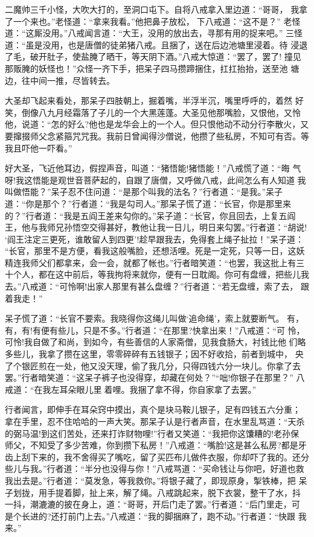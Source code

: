 二魔帅三千小怪，大吹大打的，至洞口屯下。自将八戒拿入里边道：“哥哥，
我拿了一个来也。”老怪道：“拿来我看。”他把鼻子放松，下八戒道：“这不是？”
老怪道：“这厮没用。”八戒闻言道：“大王，没用的放出去，寻那有用的捉来吧。”
三怪道：“虽是没用，也是唐僧的徒弟猪八戒。且捆了，送在后边池塘里浸着。待
浸退了毛，破开肚子，使盐腌了晒干，等天阴下酒。”八戒大惊道：“罢了，罢了!
撞见那贩腌的妖怪也！”众怪一齐下手，把呆子四马攒蹄捆住，扛扛抬抬，送至池
塘边，往中间一推，尽皆转去。

大圣却飞起来看处，那呆子四肢朝上，掘着嘴，半浮半沉，嘴里呼呼的，着然
好笑，倒像八九月经霜落了子儿的一个大黑莲蓬。大圣见他那嘴脸，又恨他，又怜
他，说道：“怎的好么?他也是龙华会上的一个人。但只恨他动不动分行李散火，又
要撺掇师父念紧箍咒咒我。我前日曾闻得沙僧说，他攒了些私房，不知可有否。等
我且吓他一吓看。”

好大圣，飞近他耳边，假捏声音，叫道：“猪悟能!猪悟能！”八戒慌了道：“晦
气呀!我这悟能是观世音菩萨起的，自跟了唐僧，又呼做八戒，此间怎么有人知道
我叫做悟能？”呆子忍不住问道：“是那个叫我的法名？”行者道：“是我。”呆子
道：“你是那个？”行者道：“我是勾司人。”那呆子慌了道：“长官，你是那里来
的？”行者道：“我是五阎王差来勾你的。”呆子道：“长官，你且回去，上复五阎
王，他与我师兄孙悟空交得甚好，教他让我一日儿，明日来勾罢。”行者道：“胡说!
‘阎王注定三更死，谁敢留人到四更’!趁早跟我去，免得套上绳子扯拉！”呆子道：
“长官，那里不是方便，看我这般嘴脸，还想活哩。死是一定死，只等一日，这妖
精连我师父们都拿来，会一会，就都了帐也。”行者暗笑道：“也罢，我这批上有三
十个人，都在这中前后，等我拘将来就你，便有一日耽阁。你可有盘缠，把些儿我
去。”八戒道：“可怜啊!出家人那里有甚么盘缠？”行者道：“若无盘缠，索了去，
跟着我走！”

呆子慌了道：“长官不要索。我晓得你这绳儿叫做‘追命绳’，索上就要断气。
有，有，有!有便有些儿，只是不多。”行者道：“在那里?快拿出来！”八戒道：“可
怜，可怜!我自做了和尚，到如今，有些善信的人家斋僧，见我食肠大，衬钱比他
们略多些儿，我拿了攒在这里，零零碎碎有五钱银子；因不好收拾，前者到城中，
央了个银匠煎在一处，他又没天理，偷了我几分，只得四钱六分一块儿。你拿了去
罢。”行者暗笑道：“这呆子裤子也没得穿，却藏在何处？”“咄!你银子在那里？”
八戒道：“在我左耳朵眼儿里着哩。我捆了拿不得，你自家拿了去罢。”

行者闻言，即伸手在耳朵窍中摸出，真个是块马鞍儿银子，足有四钱五六分重；
拿在手里，忍不住哈哈的一声大笑。那呆子认是行者声音，在水里乱骂道：“天杀
的弼马温!到这们苦处，还来打诈财物哩!”行者又笑道：“我把你这馕糟的!老孙保
师父，不知受了多少苦难，你到攒下私房！”八戒道：“嘴脸!这是甚么私房?都是牙
齿上刮下来的，我不舍得买了嘴吃，留了买匹布儿做件衣服，你却吓了我的。还分
些儿与我。”行者道：“半分也没得与你！”八戒骂道：“买命钱让与你吧，好道也救
我出去是。”行者道：“莫发急，等我救你。”将银子藏了，即现原身，掣铁棒，把
呆子划拢，用手提着脚，扯上来，解了绳。八戒跳起来，脱下衣裳，整干了水，抖
一抖，潮漉漉的披在身上，道：“哥哥，开后门走了罢。”行者道：“后门里走，可
是个长进的?还打前门上去。”八戒道：“我的脚捆麻了，跑不动。”行者道：“快跟
我来。”

